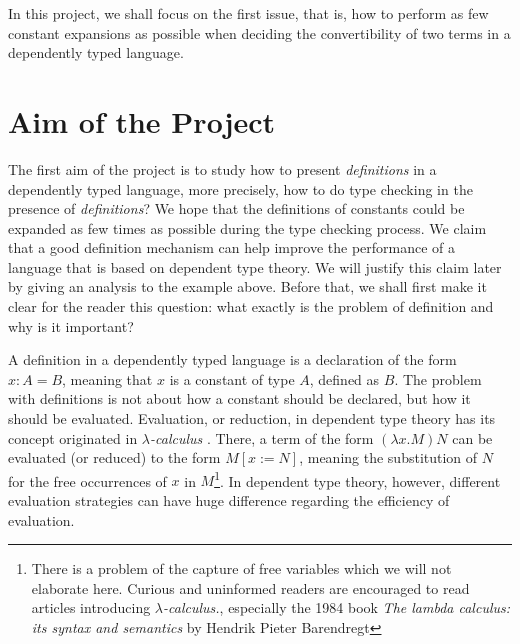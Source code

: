 In this project, we shall focus on the first issue, that is, how to perform as few constant expansions as possible when deciding the convertibility of two terms in a dependently typed language. 

\section{Aim of the Project}\label{chapter:intro:aim}
The first aim of the project is to study how to present \emph{definitions} in a dependently typed language, more precisely, how to do type checking in the presence of \emph{definitions}? We hope that the definitions of constants could be expanded as few times as possible during the type checking process. We claim that a good definition mechanism can help improve the performance of a language that is based on dependent type theory. We will justify this claim later by giving an analysis to the example above. Before that, we shall first make it clear for the reader this question: what exactly is the problem of definition and why is it important?

A definition in a dependently typed language is a declaration of the form $x : A = B$, meaning that $x$ is a constant of type $A$, defined as $B$. The problem with definitions is not about how a constant should be declared, but how it should be evaluated. Evaluation, or reduction, in dependent type theory has its concept originated in \emph{$\lambda$-calculus} \cite{barendregt1984lambda}. There, a term of the form $(\lambda x . M) N$ can be evaluated (or reduced) to the form $M[x := N]$, meaning the substitution of $N$ for the free occurrences of $x$ in $M$\footnote{There is a problem of the capture of free variables which we will not elaborate here. Curious and uninformed readers are encouraged to read articles introducing \emph{$\lambda$-calculus.}, especially the 1984 book \emph{The lambda calculus: its syntax and semantics} by Hendrik Pieter Barendregt}. In dependent type theory, however, different evaluation strategies can have huge difference regarding the efficiency of evaluation.  


